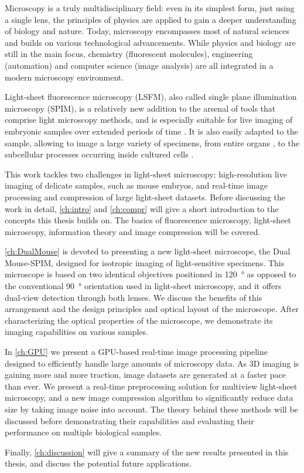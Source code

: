 Microscopy is a truly multidisciplinary field: even in its simplest form, just using a single lens, the principles of physics are applied to gain a deeper understanding of biology and nature. Today, microscopy encompasses most of natural sciences and builds on various technological advancements. While physics and biology are still in the main focus, chemistry (fluorescent molecules), engineering (automation) and computer science (image analysis) are all integrated in a modern microscopy environment.

Light-sheet fluorescence microscopy (LSFM), also called single plane illumination microscopy (SPIM), is a relatively new addition to the arsenal of tools that comprise light microscopy methods, and is especially suitable for live imaging of embryonic samples over extended periods of time \cite{keller_quantitative_2008, huisken_selective_2009, weber_light_2011,tomer_shedding_2011}. It is also easily adapted to the sample, allowing to image a large variety of specimens, from entire organs \cite{dodt_ultramicroscopy:_2007}, to the subcellular processes occurring inside cultured cells \cite{chen_lattice_2014}.

This work tackles two challenges in light-sheet microscopy: high-resolution live imaging of delicate samples, such as mouse embryos, and real-time image processing and compression of large light-sheet datasets. Before discussing the work in detail, \autoref{ch:intro} and \autoref{ch:compr} will give a short introduction to the concepts this thesis builds on. The basics of fluorescence microscopy, light-sheet microscopy, information theory and image compression will be covered.

\autoref{ch:DualMouse} is devoted to presenting a new light-sheet microscope, the Dual Mouse-SPIM, designed for isotropic imaging of light-sensitive specimens. This microscope is based on two identical objectives positioned in \SI{120}{\degree} as opposed to the conventional \SI{90}{\degree} orientation used in light-sheet microscopy, and it offers dual-view detection through both lenses. We discuss the benefits of this arrangement and the design principles and optical layout of the microscope. After characterizing the optical properties of the microscope, we demonstrate its imaging capabilities on various samples.

In \autoref{ch:GPU} we present a GPU-based real-time image processing pipeline designed to efficiently handle large amounts of microscopy data. As 3D imaging is gaining more and more traction, image datasets are generated at a faster pace than ever. We present a real-time preprocessing solution for multiview light-sheet microscopy, and a new image compression algorithm to significantly reduce data size by taking image noise into account. The theory behind these methods will be discussed before demonstrating their capabilities and evaluating their performance on multiple biological samples.

Finally, \autoref{ch:discussion} will give a summary of the new results presented in this thesis, and discuss the potential future applications.